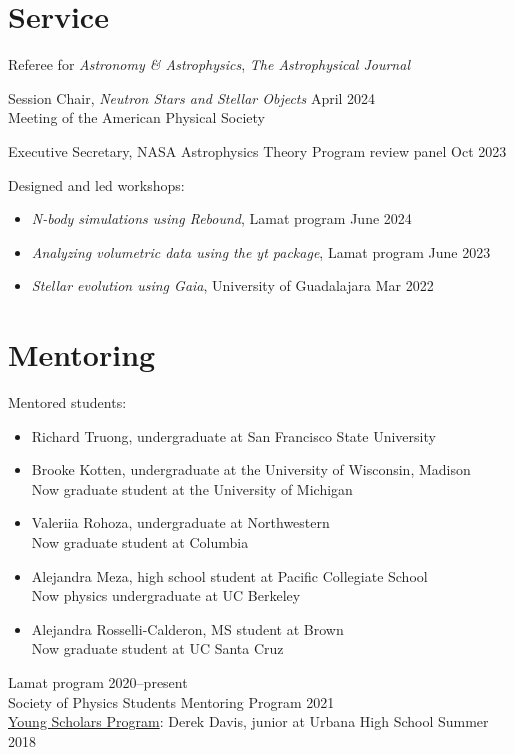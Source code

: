 \documentclass[12pt]{article}
\begin{document}
\section*{Service}
Referee for \textit{Astronomy \& Astrophysics}, \textit{The Astrophysical Journal}

Session Chair, \textit{Neutron Stars and Stellar Objects} \hfill April 2024\\
Meeting of the American Physical Society

Executive Secretary, NASA Astrophysics Theory Program review panel \hfill Oct 2023

Designed and led workshops:
\begin{itemize}
\item \textit{N-body simulations using Rebound}, Lamat program \hfill June 2024
\item \textit{Analyzing volumetric data using the yt package}, Lamat program \hfill June 2023
\item \textit{Stellar evolution using Gaia}, University of Guadalajara \hfill Mar 2022
\end{itemize}

\section*{Mentoring}
Mentored students:
\begin{itemize}
\item Richard Truong, undergraduate at San Francisco State University
\item Brooke Kotten, undergraduate at the University of Wisconsin, Madison\\Now graduate student at the University of Michigan
\item Valeriia Rohoza, undergraduate at Northwestern\\Now graduate student at Columbia
\item Alejandra Meza, high school student at Pacific Collegiate School\\Now physics undergraduate at UC Berkeley
\item Alejandra Rosselli-Calderon, MS student at Brown\\Now graduate student at UC Santa Cruz
\end{itemize}

Lamat program \hfill 2020--present\\
Society of Physics Students Mentoring Program \hfill 2021\\
\href{https://physics.illinois.edu/outreach/young-scholars}{Young Scholars Program}: Derek Davis, junior at Urbana High School \hfill Summer 2018
\end{document}
